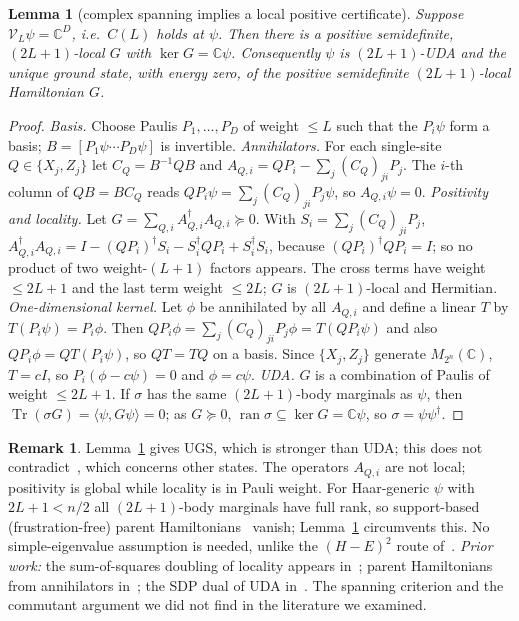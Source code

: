 \documentclass[aps,pra,onecolumn,superscriptaddress,nofootinbib,longbibliography,10pt]{revtex4-2}
\newtheorem{lemma}{Lemma}
\theoremstyle{definition}
\newtheorem{remark}[proposition]{Remark}
\newcommand{\CC}{\mathbb C}
\newcommand{\Tr}{\operatorname{Tr}}
\begin{document}
\begin{lemma}[complex spanning implies a local positive certificate]\label{lem:1}
Suppose $\mathcal V_L\psi=\CC^D$, i.e.\ $C(L)$ holds at $\psi$. Then there is a positive semidefinite, $(2L+1)$-local $G$ with $\ker G=\CC\psi$. Consequently $\psi$ is $(2L+1)$-UDA and the unique ground state, with energy zero, of the positive semidefinite $(2L+1)$-local Hamiltonian $G$.
\end{lemma}
\begin{proof}
\emph{Basis.} Choose Paulis $P_1,\dots,P_D$ of weight $\le L$ such that the $P_i\psi$ form a basis; $B=[P_1\psi\cdots P_D\psi]$ is invertible.
\emph{Annihilators.} For each single-site $Q\in\{X_j,Z_j\}$ let $C_Q=B^{-1}QB$ and $A_{Q,i}=QP_i-\sum_j(C_Q)_{ji}P_j$. The $i$-th column of $QB=BC_Q$ reads $QP_i\psi=\sum_j(C_Q)_{ji}P_j\psi$, so $A_{Q,i}\psi=0$.
\emph{Positivity and locality.} Let $G=\sum_{Q,i}A_{Q,i}^\dagger A_{Q,i}\succeq0$. With $S_i=\sum_j(C_Q)_{ji}P_j$,
$A_{Q,i}^\dagger A_{Q,i}=I-(QP_i)^\dagger S_i-S_i^\dagger QP_i+S_i^\dagger S_i$, because $(QP_i)^\dagger QP_i=I$; so no product of two weight-$(L+1)$ factors appears. The cross terms have weight $\le2L+1$ and the last term weight $\le2L$; $G$ is $(2L+1)$-local and Hermitian.
\emph{One-dimensional kernel.} Let $\phi$ be annihilated by all $A_{Q,i}$ and define a linear $T$ by $T(P_i\psi)=P_i\phi$. Then $QP_i\phi=\sum_j(C_Q)_{ji}P_j\phi=T(QP_i\psi)$ and also $QP_i\phi=QT(P_i\psi)$, so $QT=TQ$ on a basis. Since $\{X_j,Z_j\}$ generate $M_{2^n}(\CC)$, $T=cI$, so $P_i(\phi-c\psi)=0$ and $\phi=c\psi$.
\emph{UDA.} $G$ is a combination of Paulis of weight $\le2L+1$. If $\sigma$ has the same $(2L+1)$-body marginals as $\psi$, then $\Tr(\sigma G)=\langle\psi,G\psi\rangle=0$; as $G\succeq0$, $\operatorname{ran}\sigma\subseteq\ker G=\CC\psi$, so $\sigma=\psi\psi^\dagger$.
\end{proof}
\begin{remark}
Lemma~\ref{lem:1} gives UGS, which is stronger than UDA; this does not contradict~\cite{KJTV19}, which concerns other states. The operators $A_{Q,i}$ are not local; positivity is global while locality is in Pauli weight. For Haar-generic $\psi$ with $2L+1<n/2$ all $(2L+1)$-body marginals have full rank, so support-based (frustration-free) parent Hamiltonians~\cite{KJTV17} vanish; Lemma~\ref{lem:1} circumvents this. No simple-eigenvalue assumption is needed, unlike the $(H-E)^2$ route of~\cite{CJWZ12}. \emph{Prior work:} the sum-of-squares doubling of locality appears in~\cite{CJWZ12}; parent Hamiltonians from annihilators in~\cite{GST18}; the SDP dual of UDA in~\cite{HG16,KJTV19,Wyd20}. The spanning criterion and the commutant argument we did not find in the literature we examined.
\end{remark}
\end{document}
